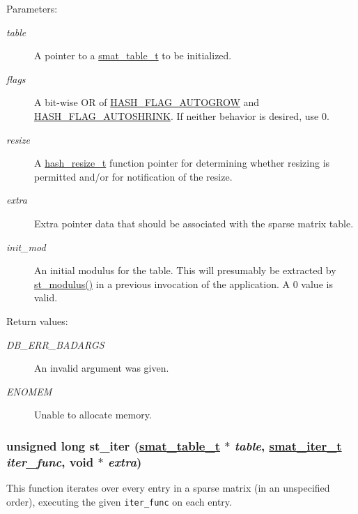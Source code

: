 \begin{Desc}
\item[Parameters:]
\begin{description}
\item[{\em table}]A pointer to a \hyperlink{group__dbprim__smat_a0}{smat\_\-table\_\-t} to be initialized. \item[{\em flags}]A bit-wise OR of \hyperlink{group__dbprim__hash_a16}{HASH\_\-FLAG\_\-AUTOGROW} and \hyperlink{group__dbprim__hash_a17}{HASH\_\-FLAG\_\-AUTOSHRINK}. If neither behavior is desired, use 0. \item[{\em resize}]A \hyperlink{group__dbprim__hash_a5}{hash\_\-resize\_\-t} function pointer for determining whether resizing is permitted and/or for notification of the resize. \item[{\em extra}]Extra pointer data that should be associated with the sparse matrix table. \item[{\em init\_\-mod}]An initial modulus for the table. This will presumably be extracted by \hyperlink{group__dbprim__smat_a24}{st\_\-modulus()} in a previous invocation of the application. A 0 value is valid.\end{description}
\end{Desc}
\begin{Desc}
\item[Return values:]
\begin{description}
\item[{\em DB\_\-ERR\_\-BADARGS}]An invalid argument was given. \item[{\em ENOMEM}]Unable to allocate memory. \end{description}
\end{Desc}
\hypertarget{group__dbprim__smat_a13}{
\subsubsection[st\_\-iter]{\setlength{\rightskip}{0pt plus 5cm}unsigned long st\_\-iter (\hyperlink{dbprim_8h_a0}{smat\_\-table\_\-t} $\ast$ {\em table}, \hyperlink{dbprim_8h_a4}{smat\_\-iter\_\-t} {\em iter\_\-func}, void $\ast$ {\em extra})}}
\label{group__dbprim__smat_a13}


This function iterates over every entry in a sparse matrix (in an unspecified order), executing the given {\tt iter\_\-func} on each entry.

